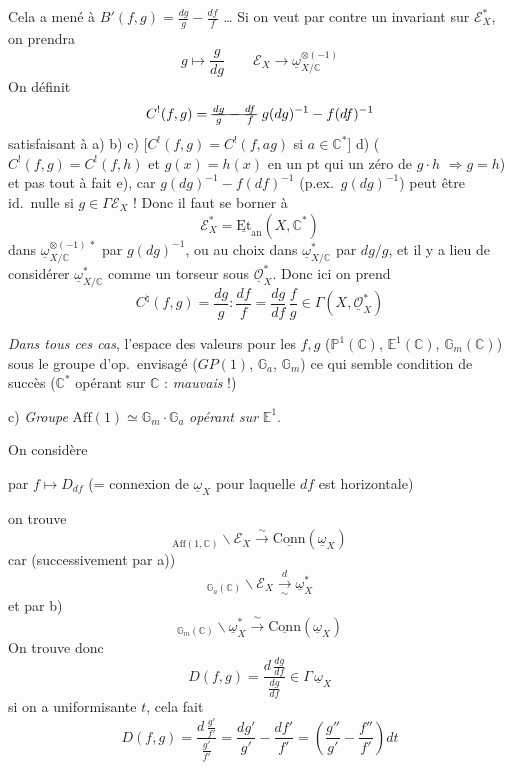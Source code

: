 \documentclass[11pt,a4paper]{article}
\begin{document}
Cela a mené à $B'(f,g) = \frac{dg}{g} - \frac{df}{f}$ … Si on veut par contre un invariant sur $\mathcal{E}_X^*$, on prendra
\[
g \longmapsto \frac{g}{dg} \qquad \mathcal{E}_X \longrightarrow \underline{\omega}_{X/\mathbb{C}}^{\otimes(-1)}
\]
On  définit
\[
C^!(f,g) = \text{\struck{$\frac{dg}{g} - \frac{df}{f}$}}\ g(dg)^{-1} - f(df)^{-1}
\]
satisfaisant à a) b) c) [$C^!(f,g) = C^!(f, ag)$ si $a \in \mathbb{C}^*$] d) ($C^!(f,g) = C^!(f,h)$ et $g(x) = h(x)$ en un pt qui  un zéro de $g \cdot h$ $\Longrightarrow g = h$) et  pas tout à fait e), car $g(dg)^{-1} - f(df)^{-1}$ (p.ex.\ $g(dg)^{-1}$)  peut être id.\ nulle si $g \in \Gamma \mathcal{E}_X$ ! Donc il faut se borner à
\[
\mathcal{E}_X^* = \underline{\mathrm{Et}}_{\mathrm{an}}(X, \mathbb{C}^*)
\]
 dans $\underline{\omega}_{X/\mathbb{C}}^{\otimes(-1)\,*}$ par $g(dg)^{-1}$, ou au choix dans $\underline{\omega}_{X/\mathbb{C}}^{*}$ par $dg/g$, et il y a lieu de considérer $\underline{\omega}^*_{X/\mathbb{C}}$ comme un torseur sous $\underline{\mathcal{O}}^*_{X}$. Donc ici on prend
\[
C^{\natural}(f,g) = \frac{dg}{g} : \frac{df}{f} = \frac{dg}{df}\, \frac{f}{g} \in \Gamma(X, \underline{\mathcal{O}}_X^*)
\]

\emph{Dans tous ces cas}, l'espace des valeurs pour les $f, g$ ($\mathbb{P}^1(\mathbb{C})$, $\mathbb{E}^1(\mathbb{C})$, $\mathbb{G}_m(\mathbb{C})$)  sous le groupe d'op.\ envisagé ($GP(1)$, $\mathbb{G}_a$, $\mathbb{G}_m$) ce qui semble condition de succès ($\mathbb{C}^*$ opérant sur $\mathbb{C}$ : \emph{mauvais} !)

c) \emph{Groupe} $\mathrm{Aff}(1) \simeq \mathbb{G}_m \cdot \mathbb{G}_a$ \emph{opérant sur} $\mathbb{E}^1$.

On considère 


par $f \longmapsto D_{df}$ (= connexion de $\underline{\omega}_X$ pour laquelle  $df$ est horizontale)

on trouve
\[
{}_{\mathrm{Aff}(1,\mathbb{C})}\backslash \mathcal{E}_X \xrightarrow{\ \sim\ } \underline{\mathrm{Conn}}(\underline{\omega}_X)
\]
car (successivement par a))
\[
{}_{\mathbb{G}_a(\mathbb{C})}\backslash \mathcal{E}_X \xrightarrow[\ \sim\ ]{d} \underline{\omega}_X^*
\]
et par b)
\[
{}_{\mathbb{G}_m(\mathbb{C})}\backslash \underline{\omega}_X^* \xrightarrow{\ \sim\ } \underline{\mathrm{Conn}}(\underline{\omega}_X)
\]
On trouve donc
\[
D(f,g) = \frac{d\,\frac{dg}{df}}{\frac{dg}{df}} \in \Gamma\, \underline{\omega}_X
\]
si on a uniformisante $t$, cela fait
\[
D(f,g) = \frac{d\,\frac{g'}{f'}}{\frac{g'}{f'}} = \frac{dg'}{g'} - \frac{df'}{f'} = \left( \frac{g''}{g'} - \frac{f''}{f'} \right) dt
\]
\end{document}

